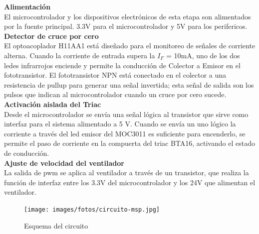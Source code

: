 \documentclass{article}
\begin{document}
        \textbf{Alimentación}\\
        El microcontrolador y los dispositivos electr\'onicos de esta etapa son alimentados por la fuente principal. 3.3V para el microcontrolador y 5V para los perifericos.\\

        \textbf{Detector de cruce por cero}\\
        El optoacoplador H11AA1 está diseñado para el monitoreo de señales de corriente alterna. Cuando la corriente de entrada supera la $I_F$ = 10mA, uno de los dos ledes infrarrojos enciende y permite la conducción de Colector a Emisor en el fototransistor. El fototransistor NPN está conectado en el colector a una resistencia de pullup para generar una señal invertida; esta señal de salida son los pulsos que indican al microcontrolador cuando un cruce por cero sucede.\\

        \textbf{Activación aislada del Triac}\\
        Desde el microcontrolador se envía una señal lógica al transistor que sirve como interfaz para el sistema alimentado a 5 V. Cuando se envía un uno lógico la corriente a través del led emisor del MOC3011 es suficiente para encenderlo, se permite el paso de corriente en la compuerta del triac BTA16, activando el estado de conducción.\\
        
        \textbf{Ajuste de velocidad del ventilador}\\
        La salida de pwm se aplica al ventilador a través de un transistor, que realiza la función de interfaz entre los 3.3V del microcontrolador y los 24V que alimentan el ventilador.\\

    \begin{figure}[ht]
        \centering
        \texttt{[image: images/fotos/circuito-msp.jpg]}
        \caption{Esquema del circuito}
        \label{fig:esquematico}
    \end{figure}
\end{document}
